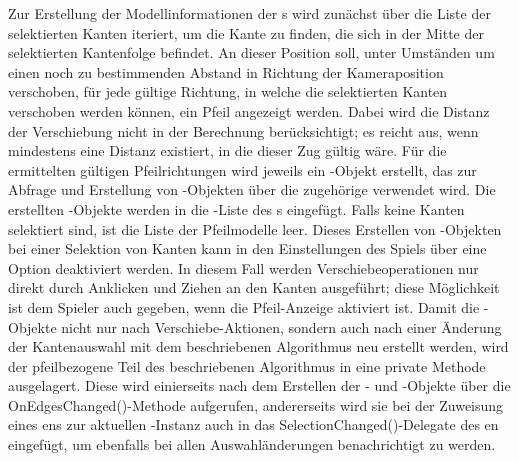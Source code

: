 Zur Erstellung der Modellinformationen der s wird zunächst über die Liste der selektierten Kanten iteriert, um die Kante zu finden, die sich in der Mitte der selektierten Kantenfolge befindet. An dieser Position soll, unter Umständen um einen noch zu bestimmenden Abstand in Richtung der Kameraposition verschoben, für jede gültige Richtung, in welche die selektierten Kanten verschoben werden können, ein Pfeil angezeigt werden. Dabei wird die Distanz der Verschiebung nicht in der Berechnung berücksichtigt; es reicht aus, wenn mindestens eine Distanz existiert, in die dieser Zug gültig wäre.
\newline\newline
Für die ermittelten gültigen Pfeilrichtungen wird jeweils ein -Objekt erstellt, das zur Abfrage und Erstellung von -Objekten über die zugehörige  verwendet wird. Die erstellten -Objekte werden in die -Liste des s eingefügt. Falls keine Kanten selektiert sind, ist die Liste der Pfeilmodelle leer.
\newline\newline
Dieses Erstellen von -Objekten bei einer Selektion von Kanten kann in den Einstellungen des Spiels über eine Option deaktiviert werden. In diesem Fall werden Verschiebeoperationen nur direkt durch Anklicken und Ziehen an den Kanten ausgeführt; diese Möglichkeit ist dem Spieler auch gegeben, wenn die Pfeil-Anzeige aktiviert ist.
\newline\newline
Damit die -Objekte nicht nur nach Verschiebe-Aktionen, sondern auch nach einer Änderung der Kantenauswahl mit dem beschriebenen Algorithmus neu erstellt werden, wird der pfeilbezogene Teil des beschriebenen Algorithmus in eine private Methode ausgelagert. Diese wird einierseits nach dem Erstellen der - und -Objekte über die OnEdgesChanged()-Methode aufgerufen, andererseits wird sie bei der Zuweisung eines ens zur aktuellen -Instanz auch in das SelectionChanged()-Delegate des en eingefügt, um ebenfalls bei allen Auswahländerungen benachrichtigt zu werden.

